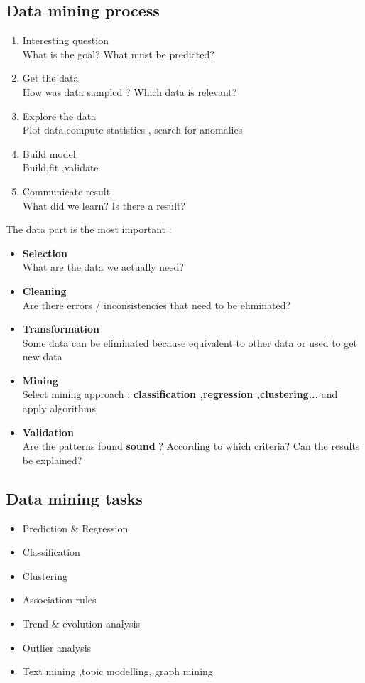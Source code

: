 \subsection{Data mining process}
\begin{enumerate}
\item Interesting question\\
What is the goal? What must be predicted?
\item Get the data \\
How was data sampled ? Which data is relevant?
\item Explore the data\\
Plot data,compute statistics , search for anomalies 
\item Build model\\
Build,fit ,validate
\item Communicate result\\
What did we learn? Is there a result?
\end{enumerate}
The data part is the most important : 
\begin{itemize}
\item \textbf{Selection}\\
What are the data we actually need?
\item \textbf{Cleaning}\\
Are there errors / inconsistencies that need to be eliminated?
\item \textbf{Transformation}\\
Some data can be eliminated because equivalent to other data or used to get new data
\item \textbf{Mining}\\
Select mining approach : \textbf{classification ,regression ,clustering...} and apply algorithms
\item \textbf{Validation}\\
Are the patterns found \textbf{sound}  ? According to which criteria? Can the results be explained?
\end{itemize}
\newpage
\subsection{Data mining tasks}
\begin{itemize}
\item {Prediction \& Regression}
\item {Classification}
\item {Clustering}
\item {Association rules}
\item {Trend \& evolution analysis}
\item {Outlier analysis}
\item {Text mining ,topic modelling, graph mining}
\end{itemize}

